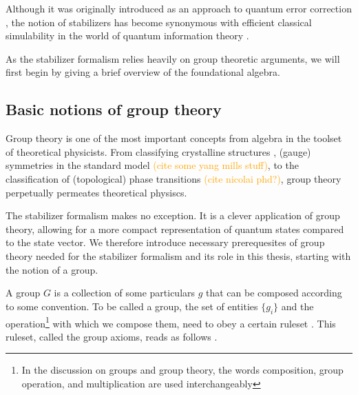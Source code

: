 Although it was originally introduced as an approach to quantum error
correction
\cite{nielsenQuantumComputationQuantum2010,gottesmanStabilizerCodesQuantum1997,gottesmanClassQuantumErrorcorrecting1996,gottesmanSurvivingQuantumComputer2024}, the notion of
stabilizers has become synonymous with efficient classical simulability in the
world of quantum information theory
\cite{nielsenQuantumComputationQuantum2010,aaronsonImprovedSimulationStabilizer2004,aaronsonIntroductionQuantumInformation,aaronsonIntroductionQuantumInformationa,fisherRandomQuantumCircuits2023}.

As the stabilizer formalism relies heavily on group theoretic arguments, we
will first begin by giving a brief overview of the foundational algebra.
\subsection{Basic notions of group theory}\label{sec:grouptheory}
Group theory is one of the most important concepts from algebra in the toolset
of theoretical physicists.
From classifying crystalline structures
\cite{ashcroftSolidStatePhysics1978},
(gauge) symmetries in the standard model \textcolor{orange}{(cite some yang
mills stuff)}, to the
classification of (topological) phase transitions \textcolor{orange}{(cite
nicolai phd?)}, group
theory perpetually permeates theoretical physiscs.

The stabilizer formalism makes no exception. It is a clever application of
group theory, allowing for a more compact representation of quantum states
compared to the state vector. We therefore introduce necessary prerequesites of
group theory needed for the stabilizer formalism and its role in this thesis,
starting with the notion of a group.

A group $G$ is a collection of some particulars $g$ that can be composed
according to some convention. To be called a group, the set of entities
$\{g_i\}$ and the operation\footnote{In the discussion on groups and group
  theory, the words composition, group operation, and multiplication are used
interchangeably} with which we compose them, need to obey a certain
ruleset \cite{zeeGroupTheoryNutshell2016}. This ruleset, called the group axioms, reads as follows
\cite{stroppelHoehereMathematik12023}.

